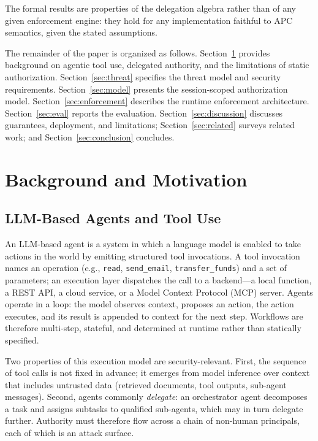 \documentclass[sigconf,nonacm]{acmart}
\begin{document}
The formal results are properties of the delegation algebra rather than of any given enforcement engine: they hold for any implementation faithful to APC semantics, given the stated assumptions.

The remainder of the paper is organized as follows. Section~\ref{sec:background} provides background on agentic tool use, delegated authority, and the limitations of static authorization. Section~\ref{sec:threat} specifies the threat model and security requirements. Section~\ref{sec:model} presents the session-scoped authorization model. Section~\ref{sec:enforcement} describes the runtime enforcement architecture. Section~\ref{sec:eval} reports the evaluation. Section~\ref{sec:discussion} discusses guarantees, deployment, and limitations; Section~\ref{sec:related} surveys related work; and Section~\ref{sec:conclusion} concludes.

\section{Background and Motivation}\label{sec:background}

\subsection{LLM-Based Agents and Tool Use}

An LLM-based agent is a system in which a language model is enabled to take actions in the world by emitting structured tool invocations. A tool invocation names an operation (e.g., \texttt{read}, \texttt{send\_email}, \texttt{transfer\_funds}) and a set of parameters; an execution layer dispatches the call to a backend---a local function, a REST API, a cloud service, or a Model Context Protocol (MCP) server. Agents operate in a loop: the model observes context, proposes an action, the action executes, and its result is appended to context for the next step. Workflows are therefore multi-step, stateful, and determined at runtime rather than statically specified.

Two properties of this execution model are security-relevant. First, the sequence of tool calls is not fixed in advance; it emerges from model inference over context that includes untrusted data (retrieved documents, tool outputs, sub-agent messages). Second, agents commonly \emph{delegate}: an orchestrator agent decomposes a task and assigns subtasks to qualified sub-agents, which may in turn delegate further. Authority must therefore flow across a chain of non-human principals, each of which is an attack surface.
\end{document}
